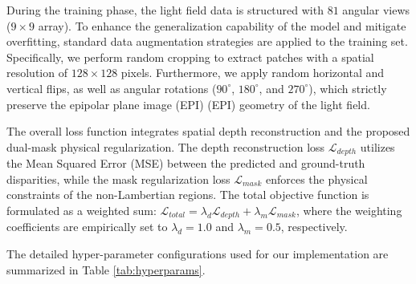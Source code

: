 \documentclass[lettersize,journal]{IEEEtran}
\begin{document}
During the training phase, the light field data is structured with $81$ angular views ($9 \times 9$ array). To enhance the generalization capability of the model and mitigate overfitting, standard data augmentation strategies are applied to the training set. Specifically, we perform random cropping to extract patches with a spatial resolution of $128 \times 128$ pixels. Furthermore, we apply random horizontal and vertical flips, as well as angular rotations ($90^\circ$, $180^\circ$, and $270^\circ$), which strictly preserve the epipolar plane image (EPI) (EPI) geometry of the light field.

The overall loss function integrates spatial depth reconstruction and the proposed dual-mask physical regularization. The depth reconstruction loss $\mathcal{L}_{depth}$ utilizes the Mean Squared Error (MSE) between the predicted and ground-truth disparities, while the mask regularization loss $\mathcal{L}_{mask}$ enforces the physical constraints of the non-Lambertian regions. The total objective function is formulated as a weighted sum: $\mathcal{L}_{total} = \lambda_{d} \mathcal{L}_{depth} + \lambda_{m} \mathcal{L}_{mask}$, where the weighting coefficients are empirically set to $\lambda_{d} = 1.0$ and $\lambda_{m} = 0.5$, respectively. 

The detailed hyper-parameter configurations used for our implementation are summarized in Table \ref{tab:hyperparams}.

\begin{table}[htbp]
  \centering
  \caption{Summary of Key Hyper-parameters for Implementation.}
  \label{tab:hyperparams}
\end{table}
\end{document}

